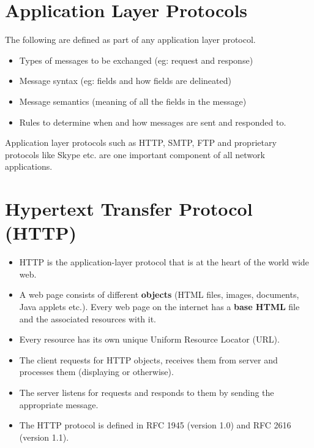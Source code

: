 \documentclass{article}
\theoremstyle{plain}
\theoremstyle{definition}
\begin{document}
\section{Application Layer Protocols}
The following are defined as part of any application layer protocol.
\begin{itemize}
    \item Types of messages to be exchanged (eg: request and response)
    
    \item Message syntax (eg: fields and how fields are delineated)
    
    \item Message semantics (meaning of all the fields in the message)
    
    \item Rules to determine when and how messages are sent and responded to.
\end{itemize}
Application layer protocols such as HTTP, SMTP, FTP and proprietary protocols like Skype etc. are one important component of all network applications. 

\section{Hypertext Transfer Protocol (HTTP)}
\begin{itemize}
    \item HTTP is the application-layer protocol that is at the heart of the world wide web. 
    
    \item A web page consists of different \textbf{objects} (HTML files, images, documents, Java applets etc.). Every web page on the internet has a \textbf{base HTML} file and the associated resources with it. 
    
    \item Every resource has its own unique Uniform Resource Locator (URL). 
    
    \item The client requests for HTTP objects, receives them from server and processes them (displaying or otherwise).
    
    \item The server listens for requests and responds to them by sending the appropriate message.
    
    \item The HTTP protocol is defined in RFC 1945 (version 1.0) and RFC 2616 (version 1.1). 
\end{itemize}
\end{document}
